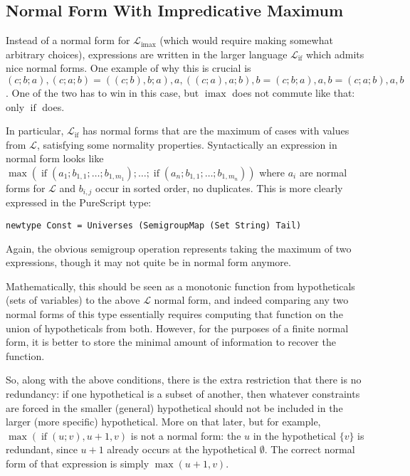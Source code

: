 \documentclass[11pt, twoside, reqno]{book}
\DeclareMathOperator{\imax}{imax}
\DeclareMathOperator{\ifop}{if}
\begin{document}
\subsection{Normal Form With Impredicative Maximum}

Instead of a normal form for $\mathcal{L}_{\imax}$ (which would require making somewhat arbitrary choices), expressions are written in the larger language $\mathcal{L}_{\ifop}$ which admits nice normal forms.
One example of why this is crucial is $(c; b; a), (c; a; b) = ((c; b), b; a), a, ((c; a), a; b), b = (c; b; a), a, b = (c; a; b), a, b$.
One of the two has to win in this case, but $\imax$ does not commute like that: only $\ifop$ does.

In particular, $\mathcal{L}_{\ifop}$ has normal forms that are the maximum of cases with values from $\mathcal{L}$, satisfying some normality properties.
Syntactically an expression in normal form looks like\\ $\max(\ifop(a_1; b_{1,1}; \dots; b_{1,m_1}); \dots; \ifop(a_n; b_{1,1}; \dots; b_{1,m_n}))$ where $a_i$ are normal forms for $\mathcal{L}$ and $b_{i,j}$ occur in sorted order, no duplicates.
This is more clearly expressed in the PureScript type:
\begin{verbatim}
newtype Const = Universes (SemigroupMap (Set String) Tail)
\end{verbatim}
Again, the obvious semigroup operation represents taking the maximum of two expressions, though it may not quite be in normal form anymore.

Mathematically, this should be seen as a monotonic function from hypotheticals (sets of variables) to the above $\mathcal{L}$ normal form, and indeed comparing any two normal forms of this type essentially requires computing that function on the union of hypotheticals from both.
However, for the purposes of a finite normal form, it is better to store the minimal amount of information to recover the function.

So, along with the above conditions, there is the extra restriction that there is no redundancy: if one hypothetical is a subset of another, then whatever constraints are forced in the smaller (general) hypothetical should not be included in the larger (more specific) hypothetical.
More on that later, but for example, $\max(\ifop(u; v), u + 1, v)$ is not a normal form: the $u$ in the hypothetical $\{v\}$ is redundant, since $u + 1$ already occurs at the hypothetical $\emptyset$.
The correct normal form of that expression is simply $\max(u+1, v)$.
\end{document}
